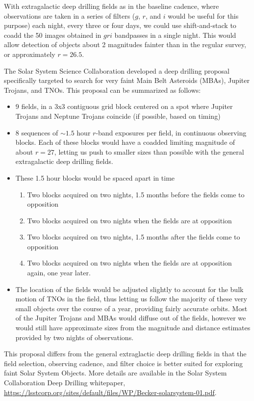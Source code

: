 With extragalactic deep drilling fields as in the baseline cadence,
where observations are taken in a series of filters ($g$, $r$, and $i$
would be useful for this purpose) each night, every three or four
days, we could use shift-and-stack to coadd the 50 images obtained in
$gri$ bandpasses in a single night. This would allow detection of
objects about 2 magnitudes fainter than in the regular survey, or
approximately $r=26.5$.

The Solar System Science Collaboration developed a deep drilling
proposal specifically targeted to search for very faint Main Belt
Asteroids (MBAs),  Jupiter Trojans,
and TNOs. This proposal can be summarized as
follows:
\begin{itemize}
\item 9 fields, in a 3x3 contiguous grid block centered on a spot
  where Jupiter Trojans and Neptune Trojans coincide (if possible,
  based on timing)
\item 8 sequences of $\sim1.5$ hour $r$-band exposures per field, in continuous
  observing blocks. Each of these blocks would have a coadded limiting
  magnitude of about $r=27$, letting us push to smaller sizes than
  possible with the general extragalactic deep drilling fields.
\item These 1.5 hour blocks would be spaced apart in time
   \begin{enumerate}
   \item Two blocks acquired on two nights, 1.5 months before the fields come to
     opposition
  \item  Two blocks acquired on two nights when the fields are at
    opposition
  \item Two blocks acquired on two nights, 1.5 months after the fields
    come to opposition
  \item Two blocks acquired on two nights when the fields are at
    opposition again, one year later. 
 \end{enumerate}
\item The location of the fields would be adjusted slightly to account
  for the bulk motion of TNOs in the field, thus letting us follow the
  majority of these very small objects over the course of a year,
  providing fairly accurate orbits. Most of the Jupiter Trojans and
  MBAs would diffuse out of the fields, however we would still have
  approximate sizes from the magnitude and distance estimates provided
  by two nights of observations. 
\end{itemize}

This proposal differs from the general extraglactic deep drilling
fields in that the field selection, observing cadence, and filter
choice is better suited for exploring faint Solar System Objects. More
details are available in the Solar System Collaboration Deep Drilling
whitepaper, \url{https://lsstcorp.org/sites/default/files/WP/Becker-solarsystem-01.pdf}.




\navigationbar
